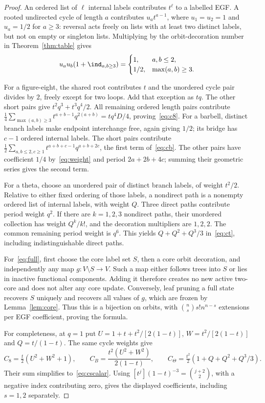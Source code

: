 \begin{proof}
An ordered list of $\ell$ internal labels contributes $t^\ell$ to a
labelled EGF. A rooted undirected cycle of length $a$ contributes
$u_at^{a-1}$, where $u_1=u_2=1$ and $u_a=1/2$ for $a\ge3$:
reversal acts freely on lists with at least two distinct labels, but not
on empty or singleton lists. Multiplying by the orbit-decoration number
in Theorem~\ref{thm:table} gives
\begin{equation}\label{eq:weight}
 u_au_b(1+\ind_{a,b\ge3})=
 \begin{cases}1,&a,b\le2,\\1/2,&\max(a,b)\ge3.\end{cases}
\end{equation}

For a figure-eight, the shared root contributes $t$ and the unordered
cycle pair divides by $2$, freely except for two loops. Add that exception
as $tq$. The other short pairs give $t^2q^3+t^3q^4/2$. All remaining
ordered length pairs contribute
$\tfrac14\sum_{\max(a,b)\ge3}t^{a+b-1}q^{2(a+b)}
=tq^4D/4$, proving~\eqref{eq:c8}.
For a barbell, distinct branch labels make endpoint interchange free,
again giving $1/2$; its bridge has $c-1$ ordered internal labels.
The short pairs contribute
$\tfrac12\sum_{a,b\le2,c\ge1}t^{a+b+c-1}q^{a+b+2c}$,
the first term of~\eqref{eq:cb}. The other pairs have coefficient $1/4$
by~\eqref{eq:weight} and period $2a+2b+4c$; summing their geometric
series gives the second term.

For a theta, choose an unordered pair of distinct branch labels, of
weight $t^2/2$. Relative to either fixed ordering of those labels, a
nondirect path is a nonempty ordered list of internal labels, with
weight $Q$. Three direct paths contribute period weight $q^2$.
If there are $k=1,2,3$ nondirect paths, their unordered collection has
weight $Q^k/k!$, and the decoration multipliers are $1,2,2$.
The common remaining period weight is $q^6$. This yields
$Q+Q^2+Q^3/3$ in~\eqref{eq:ct}, including indistinguishable direct paths.

For~\eqref{eq:full}, first choose the core label set $S$, then a core
orbit decoration, and independently any map $g:V\setminus S\to V$.
Such a map either follows trees into $S$ or lies in inactive functional
components. Adding it therefore creates no new active two-core and
does not alter any core update. Conversely, leaf pruning a full state
recovers $S$ uniquely and recovers all values of $g$, which are frozen
by Lemma~\ref{lem:core}. Thus this is a bijection on orbits, with
$\binom ns s! n^{n-s}$ extensions per EGF coefficient, proving the formula.

For completeness, at $q=1$ put
$U=1+t+t^2/[2(1-t)]$, $W=t^2/[2(1-t)]$ and $Q=t/(1-t)$.
The same cycle weights give
\[
 C_8=\tfrac t2(U^2+W^2+1),\qquad
 C_B=\frac{t^2(U^2+W^2)}{2(1-t)},\qquad
 C_\Theta=\tfrac{t^2}2(1+Q+Q^2+Q^3/3).
\]
Their sum simplifies to~\eqref{eq:cscalar}. Using
$[t^j](1-t)^{-3}=\binom{j+2}{2}$, with a negative index contributing
zero, gives the displayed coefficients, including $s=1,2$ separately.
\end{proof}

